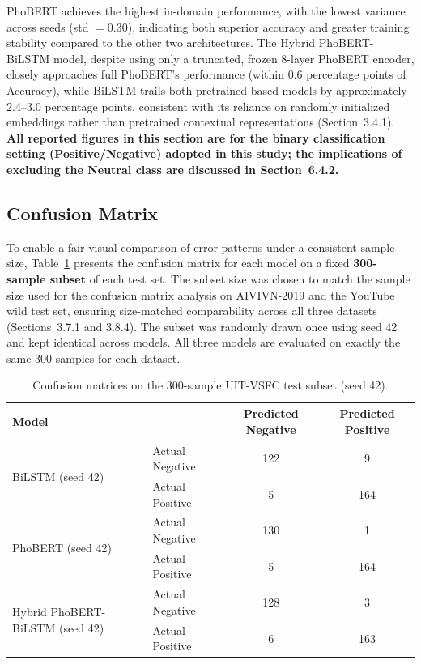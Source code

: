 \documentclass[12pt]{report} %
\begin{document}
PhoBERT achieves the highest in-domain performance, with the lowest variance across seeds (std $= 0.30$), indicating both superior accuracy and greater training stability compared to the other two architectures. The Hybrid PhoBERT-BiLSTM model, despite using only a truncated, frozen 8-layer PhoBERT encoder, closely approaches full PhoBERT's performance (within 0.6 percentage points of Accuracy), while BiLSTM trails both pretrained-based models by approximately 2.4--3.0 percentage points, consistent with its reliance on randomly initialized embeddings rather than pretrained contextual representations (Section~3.4.1). \textbf{All reported figures in this section are for the binary classification setting (Positive/Negative) adopted in this study; the implications of excluding the Neutral class are discussed in Section~6.4.2.}

\subsection{Confusion Matrix}

To enable a fair visual comparison of error patterns under a consistent sample size, Table~\ref{tab:confmat-uitvsfc} presents the confusion matrix for each model on a fixed \textbf{300-sample subset} of each test set. The subset size was chosen to match the sample size used for the confusion matrix analysis on AIVIVN-2019 and the YouTube wild test set, ensuring size-matched comparability across all three datasets (Sections~3.7.1 and 3.8.4). The subset was randomly drawn once using seed 42 and kept identical across models. All three models are evaluated on exactly the same 300 samples for each dataset.

\begin{table}[H]
    \centering
    \caption{Confusion matrices on the 300-sample UIT-VSFC test subset (seed 42).}
    \label{tab:confmat-uitvsfc}
    \begin{tabular}{llcc}
        \hline
        \textbf{Model} &                 & \textbf{Predicted Negative} & \textbf{Predicted Positive} \\
        \hline
        \multirow{2}{*}{BiLSTM (seed 42)}
                       & Actual Negative & 122                         & 9                           \\
                       & Actual Positive & 5                           & 164                         \\
        \hline
        \multirow{2}{*}{PhoBERT (seed 42)}
                       & Actual Negative & 130                         & 1                           \\
                       & Actual Positive & 5                           & 164                         \\
        \hline
        \multirow{2}{*}{Hybrid PhoBERT-BiLSTM (seed 42)}
                       & Actual Negative & 128                         & 3                           \\
                       & Actual Positive & 6                           & 163                         \\
        \hline
    \end{tabular}
\end{table}
\end{document}
